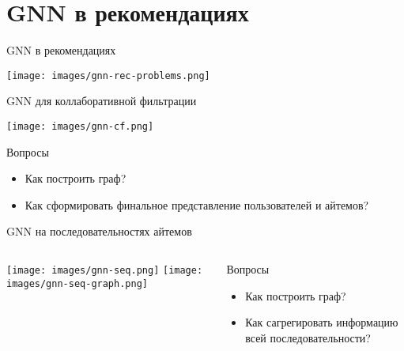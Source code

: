 \documentclass[11pt,aspectratio=169,handout]{beamer}
\begin{document}
\section{GNN в рекомендациях}

\begin{frame}{GNN в рекомендациях \cite{GNNSURVEY}}

\begin{center}
\texttt{[image: images/gnn-rec-problems.png]}
\end{center}

\end{frame}

\begin{frame}{GNN для коллаборативной фильтрации}

\begin{center}
\texttt{[image: images/gnn-cf.png]}
\end{center}

Вопросы
\begin{itemize}
\item Как построить граф?
\item Как сформировать финальное представление пользователей и айтемов?
\end{itemize}

\end{frame}

\begin{frame}{GNN на последовательностях айтемов}

\begin{columns}
\begin{column}{0.5\textwidth}
\begin{center}
\texttt{[image: images/gnn-seq.png]}
\texttt{[image: images/gnn-seq-graph.png]}
\end{center}
\end{column}

\begin{column}{0.4\textwidth}
Вопросы
\begin{itemize}
\item Как построить граф?
\item Как сагрегировать информацию всей последовательности?
\end{itemize}
\end{column}

\end{columns}

\end{frame}
\end{document}
